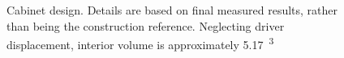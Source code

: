 \documentclass{StdTemplate} %
\begin{document}
\begin{figure}[h!]
\centering
{}
\qquad
{}
\caption{Cabinet design. Details are based on final measured results, rather than being the construction reference. Neglecting driver displacement, interior volume is approximately \SI{5.17}{\ft^3}}
\label{fig:sp_cad}
\end{figure}
%
\end{document}
